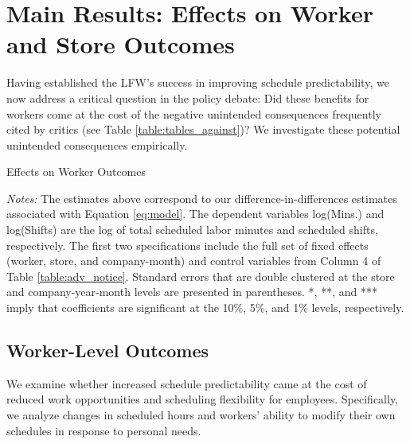 \documentclass[letterpaper,11pt,leqno]{article}
\theoremstyle{paper}
\newcommand{\note}[2][]{\parbox{\textwidth}{\footnotesize\vspace*{10pt}\textit{#1}#2}}
\begin{document}
\section{Main Results: Effects on Worker and Store Outcomes}

Having established the LFW's success in improving schedule predictability, we now address a critical question in the policy debate: Did these benefits for workers come at the cost of the negative unintended consequences frequently cited by critics (see Table \ref{table:tables_against})? We investigate these potential unintended consequences empirically. 


\begin{singlespace}
\begin{table}[h]
\caption{Effects on Worker Outcomes}

\note{\textit{Notes: } \scriptsize The estimates above correspond to our difference-in-differences estimates associated with Equation \ref{eq:model}. The dependent variables log(Mins.) and log(Shifts) are the log of total scheduled labor minutes and scheduled shifts, respectively.
The first two specifications include the full set of fixed effects (worker, store, and company-month) and control variables from Column 4 of Table \ref{table:adv_notice}. Standard errors that are double clustered at the store and company-year-month levels are presented in parentheses. *, **, and *** imply that coefficients are significant at the 10\%, 5\%, and 1\% levels, respectively.}
\label{table:worker_level}
\end{table}
\end{singlespace}

\subsection{Worker-Level Outcomes} \label{subsec:scheduled_labor}

We examine whether increased schedule predictability came at the cost of reduced work opportunities and scheduling flexibility for employees. Specifically, we analyze changes in scheduled hours and workers' ability to modify their own schedules in response to personal needs.
\end{document}
